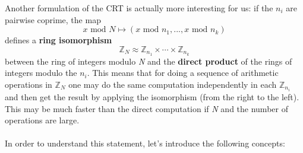 \documentclass[11pt, a4paper]{article}
\newcommand{\mymod}{
    \text{ mod }
}
\begin{document}
\newpage
\hfill\break
Another formulation of the CRT is actually more interesting for us: if the $n_i$ are pairwise coprime, the map
$$x\mymod N\mapsto (x\mymod n_1,...,x\mymod n_k)$$
defines a \textbf{ring isomorphism}
$$\mathbb{Z}_N\approx\mathbb{Z}_{n_1}\times\cdots\times\mathbb{Z}_{n_k}$$
between the ring of integers modulo \textit{N} and the \textbf{direct product} of the rings of integers modulo the $n_i$. This means that for doing a sequence of arithmetic operations in $\mathbb{Z}_N$ one may do the same computation independently in each $\mathbb{Z}_{n_i}$ and then get the result by applying the isomorphism (from the right to the left). This may be much faster than the direct computation if \textit{N} and the number of operations are large.\\\\
In order to understand this statement, let's introduce the following concepts:
\end{document}
